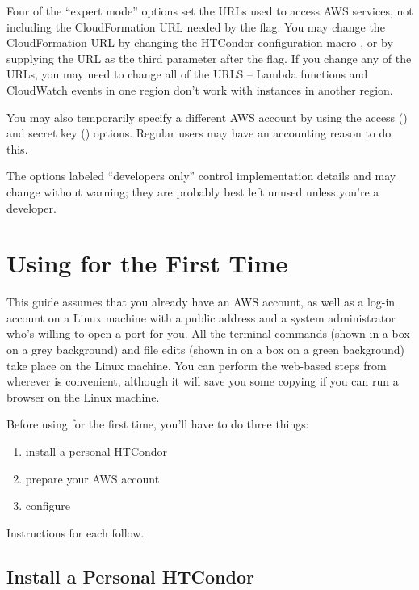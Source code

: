 Four of the ``expert mode'' options set the URLs used to access AWS services,
not including the CloudFormation URL needed by the  flag.  You
may change the CloudFormation URL by changing the HTCondor configuration
macro , or by supplying the URL as the third
parameter after the  flag.  If you change any of the URLs,
you may need to change all of the URLS -- Lambda functions and CloudWatch
events in one region don't work with instances in another region.

You may also temporarily specify a different AWS account by using the
access () and
secret key () options.  Regular users may have
an accounting reason to do this.

The options labeled ``developers only'' control implementation details and
may change without warning; they are probably best left unused unless you're
a developer.


\section{Using  for the First Time}
\label{sec:clouds-annex-first-time}

This guide assumes that you already have an AWS account, as well as a log-in
account on a Linux machine with a public address and a system administrator
who's willing to open a port for you.  All the terminal commands (shown in a
box on a grey background) and file edits (shown in on a box on a green
background) take place on the Linux machine.  You can perform the web-based
steps from wherever is convenient, although it will save you some copying if
you can run a browser on the Linux machine.

Before using  for the first time, you'll have to do three things:

\begin{enumerate}
\item install a personal HTCondor
\item prepare your AWS account
\item configure 
\end{enumerate}

Instructions for each follow.

\subsection{Install a Personal HTCondor}

